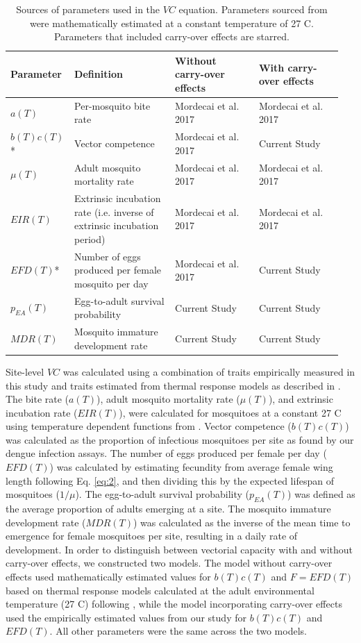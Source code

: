 \documentclass[12pt]{article}
\begin{document}
\begin{table}[h]
\centering
\begin{tabular}{P{0.15\linewidth}P{0.3\linewidth}P{0.25\linewidth}P{0.25\linewidth}}
\hline
\textbf{Parameter} & \textbf{Definition} & \textbf{Without carry-over effects} & \textbf{With carry-over effects}\\
\hline
$a(T)$ & Per-mosquito bite rate & Mordecai et al. 2017 & Mordecai et al. 2017 \\
$b(T)c(T)$* & Vector competence & Mordecai et al. 2017 & Current Study \\
$\mu(T)$ & Adult mosquito mortality rate & Mordecai et al. 2017 & Mordecai et al. 2017 \\
$EIR(T)$ & Extrinsic incubation rate (i.e. inverse of extrinsic incubation period) & Mordecai et al. 2017 & Mordecai et al. 2017 \\
$EFD(T)$* & Number of eggs produced per female mosquito per day & Mordecai et al. 2017 & Current Study \\
$p_{EA}(T)$ & Egg-to-adult survival probability & Current Study & Current Study \\
$MDR(T)$ & Mosquito immature development rate & Current Study & Current Study \\
\hline
\end{tabular}
\caption{Sources of parameters used in the $VC$ equation. Parameters sourced from \citet{mordecai2017} were mathematically estimated at a constant temperature of 27 \degree C. Parameters that included carry-over effects are starred.}
\label{table:traits}
\end{table}

Site-level $VC$ was calculated using a combination of traits empirically measured in this study and traits estimated from thermal response models as described in \citet{mordecai2017}. The bite rate ($a(T)$), adult mosquito mortality rate ($\mu(T)$), and extrinsic incubation rate ($EIR(T)$), were calculated for mosquitoes at a constant 27 \degree C using temperature dependent functions from \citet{mordecai2017}. Vector competence ($b(T)c(T)$) was calculated as the proportion of infectious mosquitoes per site as found by our dengue infection assays. The number of eggs produced per female per day ($EFD(T)$) was calculated by estimating fecundity from average female wing length following Eq. \ref{eq:2}, and then dividing this by the expected lifespan of mosquitoes ($1/\mu$). The egg-to-adult survival probability ($p_{EA}(T)$) was defined as the average proportion of adults emerging at a site. The mosquito immature development rate ($MDR(T)$) was calculated as the inverse of the mean time to emergence for female mosquitoes per site, resulting in a daily rate of development. In order to distinguish between vectorial capacity with and without carry-over effects, we constructed two models. The model without carry-over effects used mathematically estimated values for $b(T)c(T)$ and $F=EFD(T)$ based on thermal response models calculated at the adult environmental temperature (27 \degree C) following \citet{mordecai2017}, while the model incorporating carry-over effects used the empirically estimated values from our study for $b(T)c(T)$ and $EFD(T)$. All other parameters were the same across the two models.
\end{document}
